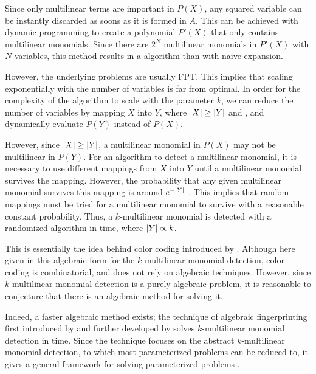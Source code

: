 Since only multilinear terms are important in $P(X)$, 
any squared variable can be instantly discarded as soons as it is formed in $A$. 
This can be achieved with dynamic programming to create a polynomial $P'(X)$ that 
only contains multilinear monomials. Since there are $2^N$ multilinear monomials in $P'(X)$ with 
$N$ variables, this method results in a
 algorithm than with naive expansion.

However, the underlying problems are usually FPT. This implies that scaling exponentially 
with the number of variables is far from optimal. In order for the complexity of the algorithm to scale 
with the parameter $k$, we can reduce the number of variables by mapping $X$ into $Y$, where 
${\left\vert X\right\vert} \geq {\left\vert Y\right\vert}$ and
, and dynamically evaluate $P(Y)$ instead of
$P(X)$. 

However, since ${\left\vert X\right\vert} \geq {\left\vert Y\right\vert}$, a multilinear monomial in $P(X)$ may not be multilinear in $P(Y)$. 
For an algorithm to detect a multilinear monomial, it is necessary to use different mappings 
from $X$ into $Y$ until a multilinear monomial survives the mapping. However, the probability 
that any given multilinear monomial survives this mapping is around $e^{-{\left\vert Y\right\vert}}$ \cite{KouWil15}.
This implies that  random mappings must be tried for a
multilinear monomial to survive with a reasonable constant probability. Thus, a
$k$-multilinear monomial is detected with a 
randomized algorithm in  time, where ${\left\vert Y\right\vert} \propto k$.

This is essentially the idea behind color coding introduced by \citeauthor{Alon95} \cite{Alon95}. 
Although here given in this algebraic form for the $k$-multilinear monomial detection, 
color coding is combinatorial, and does not rely on algebraic techniques. 
However, since $k$-multilinear monomial detection is a purely algebraic problem, it is reasonable to 
conjecture that there is an algebraic method for solving it.

Indeed, a faster algebraic method exists; the technique of algebraic fingerprinting 
first introduced by \citeauthor{Koutis08} \cite{Koutis08} and 
further developed by \citeauthor{Williams09} \cite{Williams09} 
solves $k$-multilinear monomial detection in  time. 
Since the technique focuses on the abstract $k$-multilinear monomial detection, to which 
most parameterized problems can be reduced to, it gives a general framework for 
solving parameterized problems \cite{KouWil15}.


